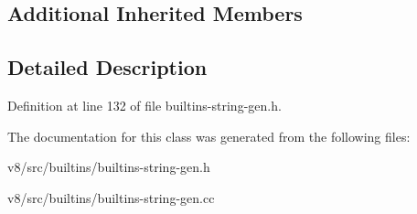 \subsection*{Additional Inherited Members}


\subsection{Detailed Description}


Definition at line 132 of file builtins-\/string-\/gen.\+h.



The documentation for this class was generated from the following files\+:\begin{DoxyCompactItemize}
\item 
v8/src/builtins/builtins-\/string-\/gen.\+h\item 
v8/src/builtins/builtins-\/string-\/gen.\+cc\end{DoxyCompactItemize}
